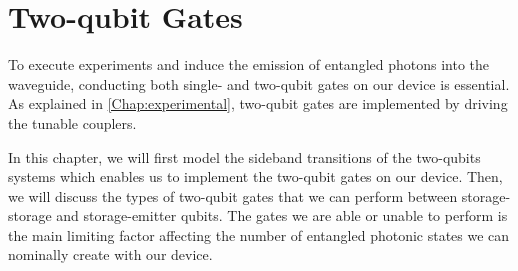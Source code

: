 \chapter{Two-qubit Gates}
\label{chap:2_qubit_gates}
\thispagestyle{fancy}

To execute experiments and induce the emission of entangled photons into the waveguide, conducting both single- and two-qubit gates on our device is essential.
As explained in \cref{Chap:experimental}, two-qubit gates are implemented by driving the tunable couplers.

In this chapter, we will first model the sideband transitions of the two-qubits systems which enables us to implement the two-qubit gates on our device.
Then, we will discuss the types of two-qubit gates that we can perform between storage-storage and storage-emitter qubits.
The gates we are able or unable to perform is the main limiting factor affecting the number of entangled photonic states we can nominally create with our device.




